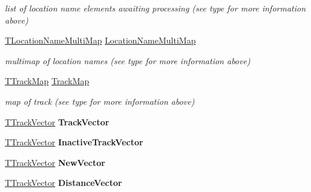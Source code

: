 \begin{DoxyCompactItemize}
\begin{DoxyCompactList}\small\item\em list of location name elements awaiting processing (see type for more information above) \end{DoxyCompactList}\item 
\mbox{\label{class_t_track_ae27a3812ad7f5113bf74f5ff63791a0c}} 
\mbox{\hyperlink{class_t_track_ac68eed5a26013072d6852aa2e6d6f33d}{T\+Location\+Name\+Multi\+Map}} \mbox{\hyperlink{class_t_track_ae27a3812ad7f5113bf74f5ff63791a0c}{Location\+Name\+Multi\+Map}}
\begin{DoxyCompactList}\small\item\em multimap of location names (see type for more information above) \end{DoxyCompactList}\item 
\mbox{\label{class_t_track_a135ff66e8de79bb2eadbd6aadf28b957}} 
\mbox{\hyperlink{class_t_track_ab03d3109c635a149c57812c89cec63a4}{T\+Track\+Map}} \mbox{\hyperlink{class_t_track_a135ff66e8de79bb2eadbd6aadf28b957}{Track\+Map}}
\begin{DoxyCompactList}\small\item\em map of track (see type for more information above) \end{DoxyCompactList}\item 
\mbox{\label{class_t_track_a1559c243f46ddcb2c0f8da885eba5942}} 
\mbox{\hyperlink{class_t_track_ac64e15050a0faf07c1b7410d60cbcbe5}{T\+Track\+Vector}} {\bfseries Track\+Vector}
\item 
\mbox{\label{class_t_track_abe65423511b3512c216857c4b6a189c4}} 
\mbox{\hyperlink{class_t_track_ac64e15050a0faf07c1b7410d60cbcbe5}{T\+Track\+Vector}} {\bfseries Inactive\+Track\+Vector}
\item 
\mbox{\label{class_t_track_a57abc3eebb9cc311b0f11441666630dd}} 
\mbox{\hyperlink{class_t_track_ac64e15050a0faf07c1b7410d60cbcbe5}{T\+Track\+Vector}} {\bfseries New\+Vector}
\item 
\mbox{\label{class_t_track_a1829522bd2d6b59f94e6b66896eaaa65}} 
\mbox{\hyperlink{class_t_track_ac64e15050a0faf07c1b7410d60cbcbe5}{T\+Track\+Vector}} {\bfseries Distance\+Vector}
\item 

\end{DoxyCompactItemize}
